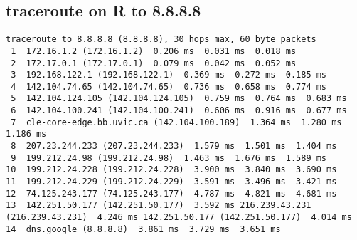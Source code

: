 \documentclass[
	letterpaper, %
	10pt, %
]{CSUniSchoolLabReport}
\begin{document}
\subsection{traceroute on R to 8.8.8.8}
\begin{center}
\begin{verbatim}
traceroute to 8.8.8.8 (8.8.8.8), 30 hops max, 60 byte packets
 1  172.16.1.2 (172.16.1.2)  0.206 ms  0.031 ms  0.018 ms
 2  172.17.0.1 (172.17.0.1)  0.079 ms  0.042 ms  0.052 ms
 3  192.168.122.1 (192.168.122.1)  0.369 ms  0.272 ms  0.185 ms
 4  142.104.74.65 (142.104.74.65)  0.736 ms  0.658 ms  0.774 ms
 5  142.104.124.105 (142.104.124.105)  0.759 ms  0.764 ms  0.683 ms
 6  142.104.100.241 (142.104.100.241)  0.606 ms  0.916 ms  0.677 ms
 7  cle-core-edge.bb.uvic.ca (142.104.100.189)  1.364 ms  1.280 ms  1.186 ms
 8  207.23.244.233 (207.23.244.233)  1.579 ms  1.501 ms  1.404 ms
 9  199.212.24.98 (199.212.24.98)  1.463 ms  1.676 ms  1.589 ms
10  199.212.24.228 (199.212.24.228)  3.900 ms  3.840 ms  3.690 ms
11  199.212.24.229 (199.212.24.229)  3.591 ms  3.496 ms  3.421 ms
12  74.125.243.177 (74.125.243.177)  4.787 ms  4.821 ms  4.681 ms
13  142.251.50.177 (142.251.50.177)  3.592 ms 216.239.43.231 (216.239.43.231)  4.246 ms 142.251.50.177 (142.251.50.177)  4.014 ms
14  dns.google (8.8.8.8)  3.861 ms  3.729 ms  3.651 ms
\end{verbatim}
\end{center}
\end{document}
